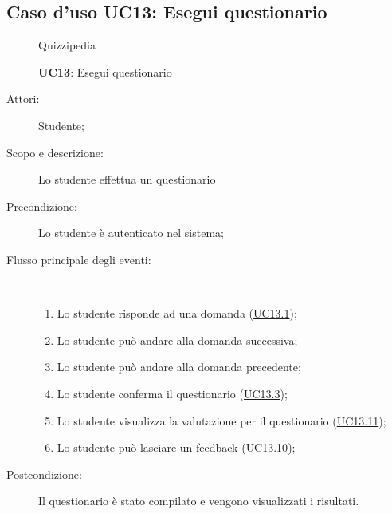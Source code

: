 \subsection{Caso d'uso UC13: Esegui questionario}
	\begin{figure}[H]
		\centering
		\begin{resizedtikzpicture}{\textwidth}
		\begin{umlsystem}[x=0, fill=lightgray!20]{Quizzipedia}
		\end{umlsystem}
		\end{resizedtikzpicture}
		\caption{\textbf{UC13}: Esegui questionario}
		\label{UC13}
	\end{figure}
\begin{description}
\item[Attori:] Studente;
\item[Scopo e descrizione:] Lo studente effettua un questionario
      \item[Precondizione:] Lo studente è autenticato nel sistema;

        \item[Flusso principale degli eventi:] \ 
 \begin{enumerate}
          \item Lo studente risponde ad una domanda (\hyperlink{UC13.1}{UC13.1});
          \item Lo studente può andare alla domanda successiva;
          \item Lo studente può andare alla domanda precedente;
          \item Lo studente conferma il questionario (\hyperlink{UC13.3}{UC13.3});
          \item Lo studente visualizza la valutazione per il questionario (\hyperlink{UC13.11}{UC13.11});
          \item Lo studente può lasciare un feedback (\hyperlink{UC13.10}{UC13.10});

      \end{enumerate}
    \item[Postcondizione:] Il questionario è stato compilato e vengono visualizzati i risultati.
  \end{description}
\hypertarget{UC13.1}{}
